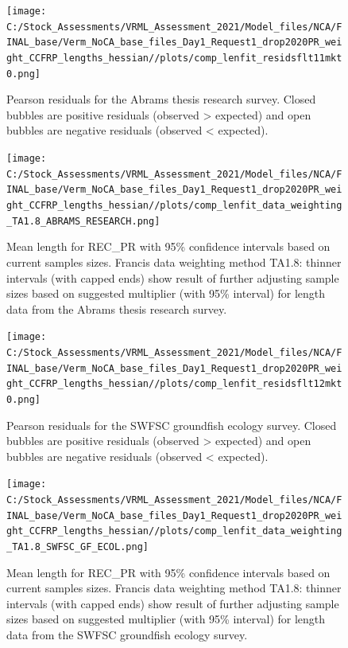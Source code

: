 \documentclass[
  english,
  a4paper,
]{article}
\begin{document}
\begin{figure}
\centering
\texttt{[image: C:/Stock\_Assessments/VRML\_Assessment\_2021/Model\_files/NCA/FINAL\_base/Verm\_NoCA\_base\_files\_Day1\_Request1\_drop2020PR\_weight\_CCFRP\_lengths\_hessian//plots/comp\_lenfit\_residsflt11mkt0.png]}
\caption{Pearson residuals for the Abrams thesis research survey. Closed bubbles are positive residuals (observed \textgreater{} expected) and open bubbles are negative residuals (observed \textless{} expected).\label{fig:len-pearson-ABRAMS-RESEARCH}}
\end{figure}

\begin{figure}
\centering
\texttt{[image: C:/Stock\_Assessments/VRML\_Assessment\_2021/Model\_files/NCA/FINAL\_base/Verm\_NoCA\_base\_files\_Day1\_Request1\_drop2020PR\_weight\_CCFRP\_lengths\_hessian//plots/comp\_lenfit\_data\_weighting\_TA1.8\_ABRAMS\_RESEARCH.png]}
\caption{Mean length for REC\_PR with 95\% confidence intervals based on current samples sizes. Francis data weighting method TA1.8: thinner intervals (with capped ends) show result of further adjusting sample sizes based on suggested multiplier (with 95\% interval) for length data from the Abrams thesis research survey.\label{fig:mean-len-fit-ABRAMS-RESEARCH}}
\end{figure}

\begin{figure}
\centering
\texttt{[image: C:/Stock\_Assessments/VRML\_Assessment\_2021/Model\_files/NCA/FINAL\_base/Verm\_NoCA\_base\_files\_Day1\_Request1\_drop2020PR\_weight\_CCFRP\_lengths\_hessian//plots/comp\_lenfit\_residsflt12mkt0.png]}
\caption{Pearson residuals for the SWFSC groundfish ecology survey. Closed bubbles are positive residuals (observed \textgreater{} expected) and open bubbles are negative residuals (observed \textless{} expected).\label{fig:len-pearson-SWFSC-GF-ECOL}}
\end{figure}

\begin{figure}
\centering
\texttt{[image: C:/Stock\_Assessments/VRML\_Assessment\_2021/Model\_files/NCA/FINAL\_base/Verm\_NoCA\_base\_files\_Day1\_Request1\_drop2020PR\_weight\_CCFRP\_lengths\_hessian//plots/comp\_lenfit\_data\_weighting\_TA1.8\_SWFSC\_GF\_ECOL.png]}
\caption{Mean length for REC\_PR with 95\% confidence intervals based on current samples sizes. Francis data weighting method TA1.8: thinner intervals (with capped ends) show result of further adjusting sample sizes based on suggested multiplier (with 95\% interval) for length data from the SWFSC groundfish ecology survey.\label{fig:mean-len-fit-SWFSC-GF-ECOL}}
\end{figure}
\end{document}
